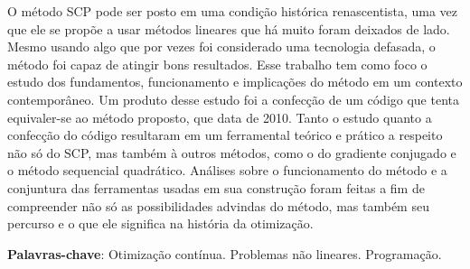 
\begin{resumo}



  O método SCP pode ser posto em uma condição histórica renascentista, uma vez que ele se propõe a usar métodos lineares que há muito foram deixados de lado. Mesmo usando algo que por vezes foi considerado uma tecnologia defasada, o método foi capaz de atingir bons resultados. Esse trabalho tem como foco o estudo dos fundamentos, funcionamento e implicações do método em um contexto contemporâneo. Um produto desse estudo foi a confecção de um código que tenta equivaler-se ao método proposto, que data de 2010. Tanto o estudo quanto a confecção do código resultaram em um ferramental teórico e prático a respeito não só do SCP, mas também à outros métodos, como o do gradiente conjugado e o método sequencial quadrático. Análises sobre o funcionamento do método e a conjuntura das ferramentas usadas em sua construção foram feitas a fim de compreender não só as possibilidades advindas do método, mas também seu percurso e o que ele significa na história da otimização. 



  \vspace{0.7cm}
  \textbf{Palavras-chave}: Otimização contínua. Problemas não lineares. Programação.

\end{resumo}
